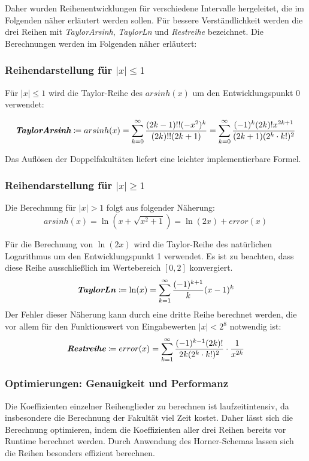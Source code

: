 \documentclass[course=erap] {aspdoc}
\begin{document}
    Daher wurden Reihenentwicklungen für verschiedene Intervalle hergeleitet, die im Folgenden näher erläutert werden sollen.
    Für bessere Verständlichkeit werden die drei Reihen mit \textit{TaylorArsinh}, \textit{TaylorLn} und \textit{Restreihe} bezeichnet.
    Die Berechnungen werden im Folgenden näher erläutert:

    \subsubsection{Reihendarstellung für $|x|\leq 1$}
    Für $|x| \leq 1$ wird die Taylor-Reihe des $arsinh(x)$ um den Entwicklungspunkt 0 \cite{taylor_series} verwendet:

    \[
        \textit{\textbf{TaylorArsinh}}\coloneqq arsinh(x) = \sum_{k = 0}^{\infty} \frac{(2k-1)!!(-x^2)^k}{(2k)!!(2k + 1)}
        = \sum_{k = 0}^{\infty} \frac{(-1)^k(2k)!x^{2k + 1}}{(2k + 1)(2^k \cdot k!)^2}
    \]

    Das Auflösen der Doppelfakultäten liefert eine leichter implementierbare Formel.

    \subsubsection{Reihendarstellung für $|x|\geq 1$}
    Die Berechnung für $|x| > 1$ folgt aus folgender Näherung:
    \[
        arsinh(x) = \ln(x + \sqrt{x^2 + 1}) = \ln(2x) + error(x)
    \]

    Für die Berechnung von $\ln(2x)$ wird die Taylor-Reihe des natürlichen Logarithmus um den Entwicklungspunkt 1\cite{taylor_series} verwendet.
    Es ist zu beachten, dass diese Reihe ausschließlich im Wertebereich $[0, 2]$ konvergiert.
    \[
        \textbf{\textit{TaylorLn}}\coloneqq\ln(x) = \sum_{k = 1}^{\infty} \frac{(-1)^{k + 1}}{k}(x - 1)^k
    \]
    Der Fehler dieser Näherung kann durch eine dritte Reihe\cite{rest_series} berechnet werden, die vor allem für den Funktionswert von Eingabewerten $|x| < 2^{8}$ notwendig ist:
    \[
        \textit{\textbf{Restreihe}}\coloneqq error(x) =  \sum_{k = 1}^{\infty} \frac{(-1)^{k - 1}(2k)!}{2k(2^k\cdot k!)^2} \cdot \frac{1}{x^{2k}}
    \]

    \subsubsection{Optimierungen: Genauigkeit und Performanz}

    Die Koeffizienten einzelner Reihenglieder zu berechnen ist laufzeitintensiv, da insbesondere die Berechnung der Fakultät viel Zeit kostet.
    Daher lässt sich die Berechnung optimieren, indem die Koeffizienten aller drei Reihen bereits vor Runtime berechnet werden.
    Durch Anwendung des Horner-Schemas lassen sich die Reihen besonders effizient berechnen.
\end{document}
